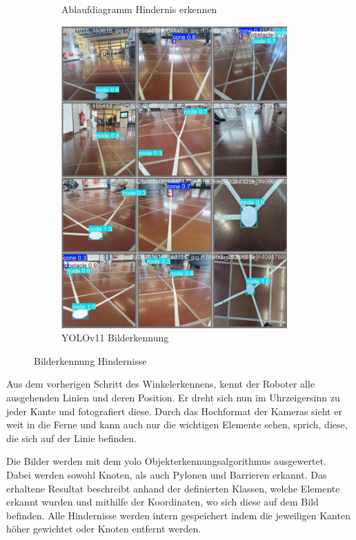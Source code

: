 \begin{figure}[H]
\begin{subfigure}{0.45\textwidth}
\caption{Ablaufdiagramm Hindernis erkennen}
\label{fig:ablaufdiagramm-hindernis-erkennen}
\end{subfigure}
\begin{subfigure}{0.5\textwidth}
\centering
\includegraphics[width=0.95\textwidth]{assets/informatik-prototyp/yolo/recognized-images.jpeg}
\caption{YOLOv11 Bilderkennung}
\label{fig:img-recognition-yolo-concept}
\end{subfigure}
\caption{Bilderkennung Hindernisse}
\label{fig:image-detection-obstacles}
\end{figure}

Aus dem vorherigen Schritt des Winkelerkennens, kennt der Roboter alle ausgehenden Linien und deren Position. Er dreht sich nun im Uhrzeigersinn zu jeder Kante und fotografiert diese. Durch das Hochformat der Kameras sieht er weit in die Ferne und kann auch nur die wichtigen Elemente sehen, sprich, diese, die sich auf der Linie befinden.

Die Bilder werden mit dem \gls{yolo} Objekterkennungsalgorithmus ausgewertet. Dabei werden sowohl Knoten, als auch Pylonen und Barrieren erkannt. Das erhaltene Resultat beschreibt anhand der definierten Klassen, welche Elemente erkannt wurden und mithilfe der Koordinaten, wo sich diese auf dem Bild befinden.
Alle Hindernisse werden intern gespeichert indem die jeweiligen Kanten höher gewichtet oder Knoten entfernt werden.


